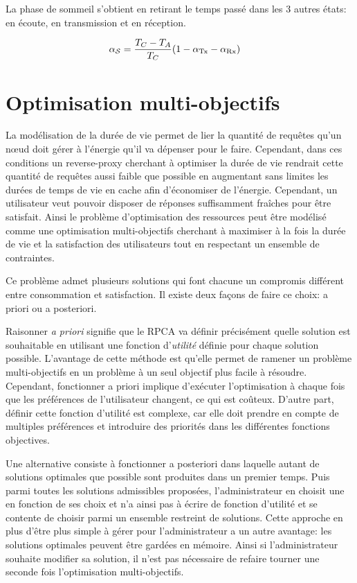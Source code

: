 La phase de sommeil s'obtient en retirant le temps passé dans les 3 autres états: en écoute, en transmission et en réception.

\begin{align}
  \alpha_{\mathcal{S}} &= \frac{T_C - T_A}{T_C}(1 - \alpha_{\textrm{Tx}} - \alpha_{\textrm{Rx}})
  \label{contikimac:eq:sleep}
\end{align}

\section{Optimisation multi-objectifs}
\label{cache:moo}

La modélisation de la durée de vie permet de lier la quantité de requêtes qu'un nœud doit gérer à l'énergie qu'il va dépenser pour le faire.
Cependant, dans ces conditions un reverse-proxy cherchant à optimiser la durée de vie rendrait cette quantité de requêtes aussi faible que possible en augmentant sans limites les durées de temps de vie en cache afin d'économiser de l'énergie.
Cependant, un utilisateur veut pouvoir disposer de réponses suffisamment fraîches pour être satisfait.
Ainsi le problème d'optimisation des ressources peut être modélisé comme une optimisation multi-objectifs cherchant à maximiser à la fois la durée de vie et la satisfaction des utilisateurs tout en respectant un ensemble de contraintes.

Ce problème admet plusieurs solutions qui font chacune un compromis différent entre consommation et satisfaction.
Il existe deux façons de faire ce choix: a priori ou a posteriori.

Raisonner \emph{a priori} signifie que le \ac{RPCA} va définir précisément quelle solution est souhaitable en utilisant une fonction d'\emph{utilité} définie pour chaque solution possible.
L'avantage de cette méthode est qu'elle permet de ramener un problème multi-objectifs en un problème à un seul objectif plus facile à résoudre.
Cependant, fonctionner a priori implique d'exécuter l'optimisation à chaque fois que les préférences de l'utilisateur changent, ce qui est coûteux.
D'autre part, définir cette fonction d'utilité est complexe, car elle doit prendre en compte de multiples préférences et introduire des priorités dans les différentes fonctions objectives.

Une alternative consiste à fonctionner a posteriori dans laquelle autant de solutions optimales que possible sont produites dans un premier temps.
Puis parmi toutes les solutions admissibles proposées, l'administrateur en choisit une en fonction de ses choix et n'a ainsi pas à écrire de fonction d'utilité et se contente de choisir parmi un ensemble restreint de solutions.
Cette approche en plus d'être plus simple à gérer pour l'administrateur a un autre avantage: les solutions optimales peuvent être gardées en mémoire.
Ainsi si l'administrateur souhaite modifier sa solution, il n'est pas nécessaire de refaire tourner une seconde fois l'optimisation multi-objectifs.

